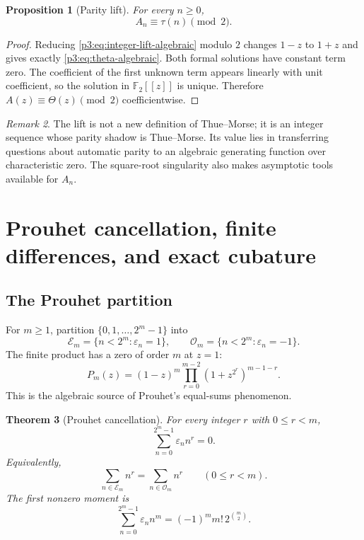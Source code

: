 \documentclass[11pt,oneside]{article}
\newtheorem{theorem}{Theorem}[section]
\newtheorem{proposition}[theorem]{Proposition}
\theoremstyle{definition}
\theoremstyle{remark}
\newtheorem{remark}[theorem]{Remark}
\newcommand{\Ftwo}{\mathbb F_2}
\newcommand{\eps}{\varepsilon}
\begin{document}
\begin{proposition}[Parity lift]\label{p3:prop:integer-lift-parity}
For every $n\ge0$,
\begin{equation}\label{p3:eq:integer-lift-parity}
 A_n\equiv\tau(n)\pmod2.
\end{equation}
\end{proposition}

\begin{proof}
Reducing \cref{p3:eq:integer-lift-algebraic} modulo $2$ changes $1-z$ to $1+z$
and gives exactly \cref{p3:eq:theta-algebraic}.  Both formal solutions have
constant term zero.  The coefficient of the first unknown term appears
linearly with unit coefficient, so the solution in $\Ftwo[[z]]$ is unique.
Therefore $A(z)\equiv\Theta(z)\pmod2$ coefficientwise.
\end{proof}

\begin{remark}
The lift is not a new definition of Thue--Morse; it is an integer sequence whose
parity shadow is Thue--Morse.  Its value lies in transferring questions about
automatic parity to an algebraic generating function over characteristic zero.
The square-root singularity also makes asymptotic tools available for $A_n$.
\end{remark}

\section{Prouhet cancellation, finite differences, and exact cubature}

\subsection{The Prouhet partition}

For $m\ge1$, partition $\{0,1,\ldots,2^m-1\}$ into
\begin{equation}\label{p3:eq:prouhet-partition}
 \mathcal E_m=\{n<2^m:\eps_n=1\},
 \qquad
 \mathcal O_m=\{n<2^m:\eps_n=-1\}.
\end{equation}
The finite product has a zero of order $m$ at $z=1$:
\begin{equation}\label{p3:eq:P-zero-order}
 P_m(z)=(1-z)^m
 \prod_{r=0}^{m-2}(1+z^{2^r})^{m-1-r}.
\end{equation}
This is the algebraic source of Prouhet's equal-sums phenomenon.

\begin{theorem}[Prouhet cancellation]\label{p3:thm:prouhet}
For every integer $r$ with $0\le r<m$,
\begin{equation}\label{p3:eq:prouhet-moments}
 \sum_{n=0}^{2^m-1}\eps_n n^r=0.
\end{equation}
Equivalently,
\begin{equation}\label{p3:eq:prouhet-equal-powers}
 \sum_{n\in\mathcal E_m}n^r
 =\sum_{n\in\mathcal O_m}n^r
 \qquad(0\le r<m).
\end{equation}
The first nonzero moment is
\begin{equation}\label{p3:eq:first-nonzero-moment}
 \sum_{n=0}^{2^m-1}\eps_n n^m
 =(-1)^m m!\,2^{\binom m2}.
\end{equation}
\end{theorem}
\end{document}
